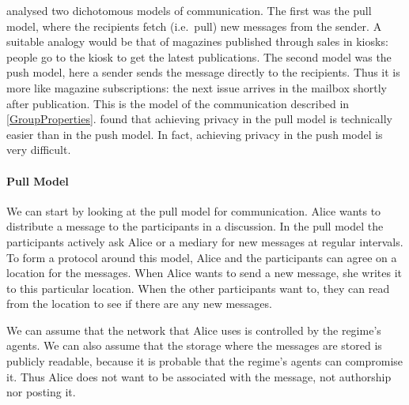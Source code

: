 \citet{PPACforPubFS} analysed two dichotomous models of communication.
The first was the pull model, where the recipients fetch (i.e.\ pull) new 
messages from the sender.
A suitable analogy would be that of magazines published through sales in 
kiosks: people go to the kiosk to get the latest publications.
The second model was the push model, here a sender sends the message directly 
to the recipients.
Thus it is more like magazine subscriptions: the next issue arrives in the 
mailbox shortly after publication.
This is the model of the communication described in \cref{GroupProperties}.
\citeauthor{PPACforPubFS} found that achieving privacy in the pull model is 
technically easier than in the push model.
In fact, achieving privacy in the push model is very difficult.

\paragraph{Pull Model}
We can start by looking at the pull model for communication.
Alice wants to distribute a message to the participants in a discussion.
In the pull model the participants actively ask Alice or a mediary for new 
messages at regular intervals.
To form a protocol around this model, Alice and the participants can agree on 
a location for the messages.
When Alice wants to send a new message, she writes it to this particular 
location.
When the other participants want to, they can read from the location to see if 
there are any new messages.

We can assume that the network that Alice uses is controlled by the regime's 
agents.
We can also assume that the storage where the messages are stored is publicly 
readable, because it is probable that the regime's agents can compromise it.
Thus Alice does not want to be associated with the message, not authorship nor 
posting it.

